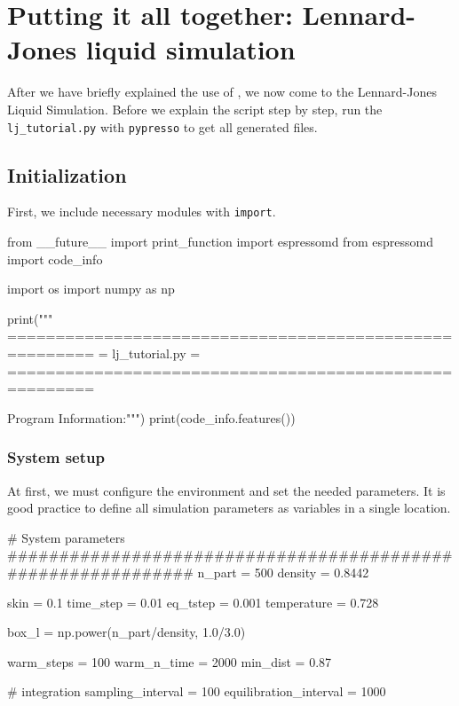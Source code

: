 \documentclass[
paper=a4,                       %
fontsize=11pt,                  %
twoside,                        %
footsepline,                    %
headsepline,                    %
headinclude=false,              %
footinclude=false,              %
pagesize,                       %
]{scrartcl}
\begin{document}
\section{Putting it all together: Lennard-Jones liquid simulation}

After we have briefly explained the use of \es{}, we now come to the
Lennard-Jones Liquid Simulation.  Before we explain the script step by step, run the
\texttt{lj\_tutorial.py}  with \texttt{pypresso} to get all generated files.


\subsection{Initialization}

First, we include necessary modules with \lstinline|import|.
{\small\vspace{0,2cm}
\begin{pypresso}
from __future__ import print_function
import espressomd
from espressomd import code_info

import os 
import numpy as np

print("""
=======================================================
=                    lj_tutorial.py                   =
=======================================================

Program Information:""")
print(code_info.features())

\end{pypresso}\vspace{0,2cm}

\subsubsection{System setup}
At first, we must configure the environment and set the needed parameters.
It is good practice to define all simulation parameters as variables in a single location.
{\small\vspace{0,2cm}
\begin{pypresso}
# System parameters
#############################################################
n_part  = 500
density = 0.8442

skin        = 0.1
time_step   = 0.01 
eq_tstep    = 0.001
temperature = 0.728

box_l       = np.power(n_part/density, 1.0/3.0) 

warm_steps  = 100
warm_n_time = 2000
min_dist    = 0.87

# integration
sampling_interval       = 100
equilibration_interval  = 1000


\end{pypresso}}}
\end{document}
